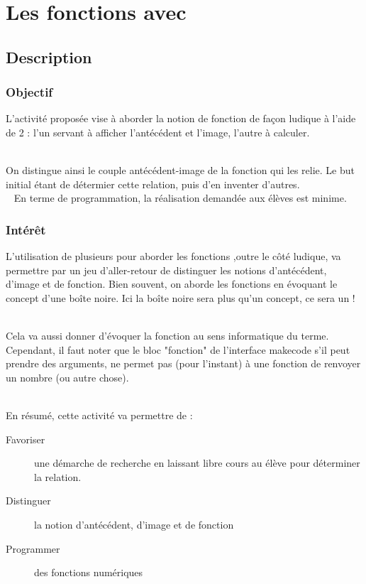 

\section{Les fonctions avec \mb}


\subsection{Description}

\subsubsection{Objectif}
\begin{formule}
L'activité proposée vise à aborder la notion de fonction de façon ludique à l'aide de 2 \mb : l'un servant
à afficher l'antécédent et l'image, l'autre à calculer.\\~

On distingue ainsi le couple antécédent-image de la fonction qui les relie. Le but initial étant de détermier cette relation, puis d'en inventer d'autres.\\~
En terme de programmation, la réalisation demandée aux élèves est minime.
\end{formule}


\subsubsection{Intérêt}

L'utilisation de plusieurs \mb pour aborder les fonctions ,outre le côté ludique, va permettre par un jeu d'aller-retour
de distinguer les notions d'antécédent, d'image et de fonction. Bien souvent, on aborde les fonctions 
en évoquant le concept d'une boîte noire. Ici la boîte noire sera plus qu'un concept, ce sera un \mb !\\~

Cela va aussi donner d'évoquer la fonction au sens informatique du terme. Cependant, il faut noter que le bloc "fonction" de 
l'interface makecode s'il peut prendre des arguments, ne permet pas (pour l'instant) à une fonction de renvoyer un nombre (ou autre chose).\\~

En résumé, cette activité va permettre de :


\begin{description}
    \item [Favoriser] une démarche de recherche en laissant libre cours au élève pour déterminer la relation.
    \item [Distinguer] la notion d'antécédent, d'image et de fonction
    \item [Programmer] des fonctions numériques
\end{description}


